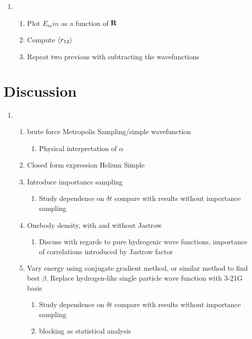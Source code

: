 \documentclass[11pt]{article}
\begin{document}
\begin{enumerate}
\item
	\begin{enumerate}
		\item Plot \(E_min \) as a function of \(\vb{R}\)
		\item Compute \( \expval{r_{12}} \)
		\item Repeat two previous with subtracting the wavefunctions
	\end{enumerate}

\end{enumerate}


\section{Discussion}

\begin{enumerate}
\item

	\begin{enumerate}
		\item brute force Metropolis Sampling/simple wavefunction
			\begin{enumerate}
				\item Physical interpretation of \(\alpha\)
			\end{enumerate}
		\item Closed form expression Helium Simple
		\item Introduce importance sampling \label{lt:importance}
			\begin{enumerate}
				\item Study dependence on \(\delta t\) compare with results without importance sampling
			\end{enumerate}
		\item Onebody density, with and without Jastrow \label{lt:onebody}
			\begin{enumerate}
				\item Discuss with regards to pure hydrogenic wave functions, importance of correlations introduced by Jastrow factor
			\end{enumerate}
		\item Vary energy using conjugate gradient method, or similar method to find best \(\beta\). Replace hydrogen-like single particle wave function with 3-21G basis
			\begin{enumerate}
				\item Study dependence on \(\delta t\) compare with results without importance sampling
				\item blocking as statistical analysis
			\end{enumerate}
	\end{enumerate}


\end{enumerate}
\end{document}
